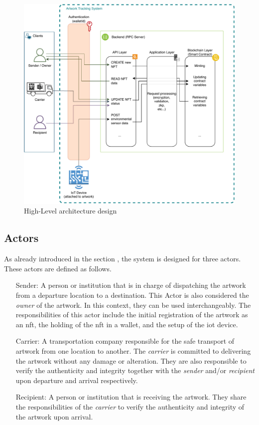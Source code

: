 \begin{figure}[ht]
    \centering
    \includegraphics[height=0.5\textheight, keepaspectratio]{diagrams/Architecture.drawio.pdf}
    \caption{High-Level architecture design}
    \label{fig:architecture}
\end{figure}

\subsection{Actors}
As already introduced in the section , the system is designed for three actors. These actors are defined as follows.
\begin{itemize}[align=left, font=\itshape]
    \item[Sender:] A person or institution that is in charge of dispatching the artwork from a departure location to a destination. This Actor is also considered the \textit{owner} of the artwork. In this context, they can be used interchangeably. The responsibilities of this actor include the initial registration of the artwork as an \gls{nft}, the holding of the \gls{nft} in a \gls{wallet}, and the setup of the \gls{iot} device.

    \item[Carrier:] A transportation company responsible for the safe transport of artwork from one location to another. The \textit{carrier} is committed to delivering the artwork without any damage or alteration. They are also responsible to verify the authenticity and integrity together with the \textit{sender} and/or \textit{recipient} upon departure and arrival respectively.

    \item[Recipient:] A person or institution that is receiving the artwork. They share the responsibilities of the \textit{carrier} to verify the authenticity and integrity of the artwork upon arrival. 
\end{itemize}


